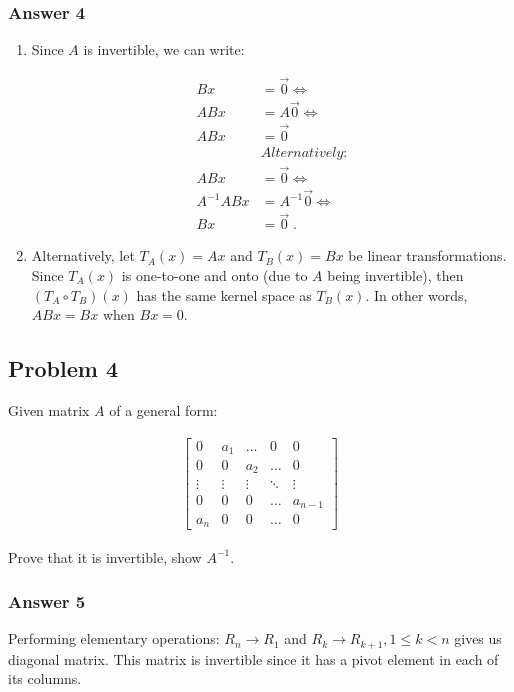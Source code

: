 \documentclass[11pt]{article}
\begin{document}
\subsubsection{Answer 4}
\label{sec:orgheadline6}
\begin{enumerate}
\item Since \(A\) is invertible, we can write:

\begin{align*}
  Bx &= \vec{0} \iff \\
  ABx &= A\vec{0} \iff \\
  ABx &= \vec{0} \\
        &\textit{Alternatively:} \\
  ABx &= \vec{0} \iff \\
  A^{-1}ABx &= A^{-1}\vec{0} \iff \\
  Bx &= \vec{0}\;.
\end{align*}

\item Alternatively, let \(T_A(x)=Ax\) and \(T_B(x) = Bx\) be linear
transformations.  Since \(T_A(x)\) is one-to-one and onto (due to \(A\) being
invertible), then \((T_A \circ T_B)(x)\) has the same kernel space as
\(T_B(x)\).  In other words, \(ABx = Bx\) when \(Bx = 0\).
\end{enumerate}

\subsection{Problem 4}
\label{sec:orgheadline9}
Given matrix \(A\) of a general form:

\begin{align*}
  \begin{bmatrix}
    0      & a_1    & \dots  & 0      & 0 \\
    0      & 0      & a_2    & \dots  & 0 \\
    \vdots & \vdots & \vdots & \ddots & \vdots \\
    0      & 0      & 0      & \dots  & a_{n-1} \\
    a_n    & 0      & 0      & \dots  & 0
  \end{bmatrix}
\end{align*}

Prove that it is invertible, show \(A^{-1}\).

\subsubsection{Answer 5}
\label{sec:orgheadline8}
Performing elementary operations: \(R_n \to R_1\) and \(R_k \to R_{k+1}, 1 \leq
    k < n\) gives us diagonal matrix.  This matrix is invertible since it has a
pivot element in each of its columns.
\end{document}
